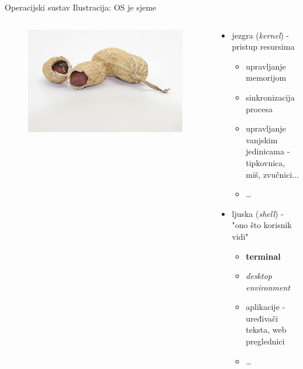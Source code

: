 \documentclass{beamer}
\begin{document}
\begin{frame}{Operacijski sustav}
Ilustracija: OS je sjeme
\begin{columns}[T]
    \begin{column}{.5\textwidth}
      \begin{figure}[h]
        \begin{minipage}{\textwidth}
          \centering
          \includegraphics[width=\linewidth]{peanut.jpg}
        \end{minipage}
      \end{figure}
    \end{column}

    \begin{column}{.5\textwidth}
      \begin{itemize}
        \item jezgra (\textit{kernel}) - pristup resursima
          \begin{footnotesize}
            \begin{itemize}
              \item upravljanje memorijom
              \item sinkronizacija procesa
              \item upravljanje vanjskim jedinicama - tipkovnica, miš, zvučnici...
              \item \dots
            \end{itemize}
          \end{footnotesize}
      
        \item ljuska (\textit{shell}) - "ono što korisnik vidi"
          \begin{footnotesize}
            \begin{itemize}
              \item \textbf{terminal}
              \item \textit{desktop environment}
              \item aplikacije - uređivači teksta, web preglednici
              \item \dots
            \end{itemize}
          \end{footnotesize}
      \end{itemize}
    \end{column}
  \end{columns}
\end{frame}
\end{document}
